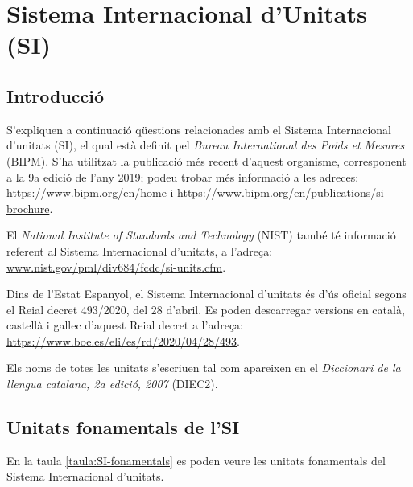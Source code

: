 \chapter{Sistema Internacional d'Unitats (SI)}\label{sec:SI}

\section{Introducció}\label{sec:SI-intro}
S'expliquen a continuació qüestions relacionades amb el Sistema
Internacional d'unitats (SI), el qual està definit pel  \textit{Bureau
International des Poids et Mesures} (BIPM). S'ha utilitzat la publicació més recent d'aquest organisme, corresponent a la 9a edició de l'any 2019; podeu trobar més informació a les adreces: \href{https://www.bipm.org/en/home/}{https://www.bipm.org/en/home} i \href{https://www.bipm.org/en/publications/si-brochure/}{https://www.bipm.org/en/publications/si-brochure}. 

El  \textit{National Institute of Standards and Technology} (NIST) també té informació referent al Sistema
Internacional d'unitats, a l'adreça: \href{http://www.nist.gov/pml/div684/fcdc/si-units.cfm}
{www.nist.gov/pml/div684/fcdc/si-units.cfm}.

Dins de l'Estat Espanyol, el Sistema Internacional d'unitats és d'ús oficial segons el Reial decret 493/2020, del 28 d'abril. Es poden descarregar versions en català, castellà i gallec d'aquest Reial decret a l'adreça: \href{https://www.boe.es/eli/es/rd/2020/04/28/493}
{https://www.boe.es/eli/es/rd/2020/04/28/493}.

Els noms de totes les unitats s'escriuen tal com apareixen en el  \textit{Diccionari de la llengua catalana, 2a edició, 2007} (DIEC2).

\section{Unitats fonamentals de l'SI}

En la taula \vref{taula:SI-fonamentals} es poden veure les unitats
fonamentals del Sistema Internacional d'unitats.

